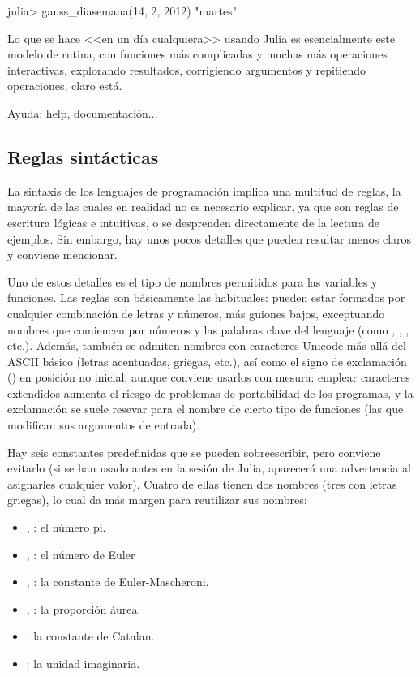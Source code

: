 ﻿\documentclass[spanish]{article}
\begin{document}
julia> gauss_diasemana(14, 2, 2012)
"martes"

Lo que se hace <<en un día cualquiera>> usando Julia es esencialmente
este modelo de rutina, con funciones más complicadas y muchas más
operaciones interactivas, explorando resultados, corrigiendo argumentos
y repitiendo operaciones, claro está.

Ayuda: help, documentación...

\subsection{Reglas sintácticas}

La sintaxis de los lenguajes de programación implica una multitud
de reglas, la mayoría de las cuales en realidad no es necesario explicar,
ya que son reglas de escritura lógicas e intuitivas, o se desprenden
directamente de la lectura de ejemplos. Sin embargo, hay unos pocos
detalles que pueden resultar menos claros y conviene mencionar.

Uno de estos detalles es el tipo de nombres permitidos para las variables
y funciones. Las reglas son básicamente las habituales: pueden
estar formados por cualquier combinación de letras y números, más
guiones bajos, exceptuando nombres que comiencen por números y las palabras
clave del lenguaje (como , , ,
etc.). Además, también se admiten nombres con caracteres Unicode más
allá del ASCII básico (letras acentuadas, griegas, etc.), así como
el signo de exclamación (\code{!}) en posición no inicial, aunque
conviene usarlos con mesura: emplear caracteres extendidos aumenta el riesgo
de problemas de portabilidad de los programas, y la exclamación se
suele resevar para el nombre de cierto tipo de funciones (las que
modifican sus argumentos de entrada).

Hay seis constantes predefinidas que se pueden
sobreescribir, pero conviene evitarlo (si se han usado antes en la sesión
de Julia, aparecerá una advertencia al asignarles cualquier valor). Cuatro
de ellas tienen dos nombres (tres con letras griegas), lo
cual da más margen para reutilizar sus nombres:

\begin{itemize}
  \item {}, \code{$\pi$}: el número pi.
  \item {}, : el número de Euler
  \item {}, \code{$\gamma$}: la constante de Euler-Mascheroni.
  \item {}, \code{$\Phi$}: la proporción áurea.
  \item {}: la constante de Catalan.
  \item {}: la unidad imaginaria.
\end{itemize}
\end{document}
